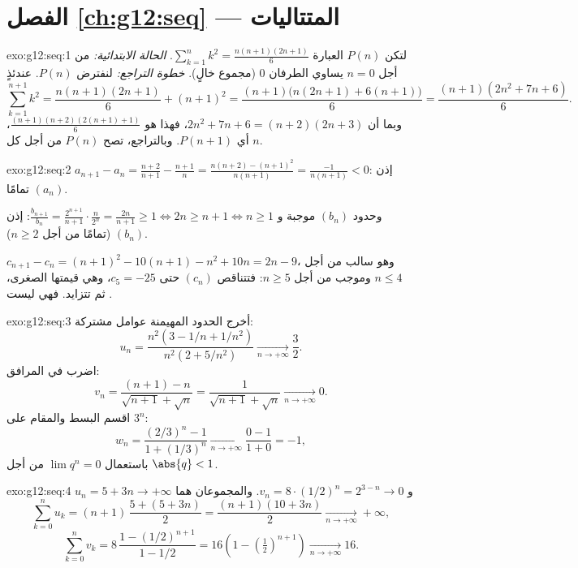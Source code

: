 \section*{الفصل \ref{ch:g12:seq} --- المتتاليات}

\begin{solution}{exo:g12:seq:1}
لتكن $P(n)$ العبارة $\sum_{k=1}^{n} k^2 = \frac{n(n+1)(2n+1)}{6}$.
\emph{الحالة الابتدائية:} من أجل $n = 0$ يساوي الطرفان $0$ (مجموع خالٍ).
\emph{خطوة التراجع:} لنفترض $P(n)$. عندئذٍ
\[
\sum_{k=1}^{n+1} k^2 = \frac{n(n+1)(2n+1)}{6} + (n+1)^2
= \frac{(n+1)\bigl(n(2n+1) + 6(n+1)\bigr)}{6}
= \frac{(n+1)(2n^2 + 7n + 6)}{6}.
\]
وبما أن $2n^2 + 7n + 6 = (n+2)(2n+3)$، فهذا هو
$\frac{(n+1)(n+2)(2(n+1)+1)}{6}$، أي $P(n+1)$. وبالتراجع، تصح $P(n)$
من أجل كل $n$.
\end{solution}

\begin{solution}{exo:g12:seq:2}
$a_{n+1} - a_n = \frac{n+2}{n+1} - \frac{n+1}{n}
= \frac{n(n+2) - (n+1)^2}{n(n+1)} = \frac{-1}{n(n+1)} < 0$: إذن $(a_n)$
 تمامًا.

وحدود $(b_n)$ موجبة و
$\frac{b_{n+1}}{b_n} = \frac{2^{n+1}}{n+1}\cdot\frac{n}{2^n} =
\frac{2n}{n+1} \geq 1 \iff 2n \geq n+1 \iff n \geq 1$: إذن $(b_n)$ 
(تمامًا من أجل $n \geq 2$).

$c_{n+1} - c_n = (n+1)^2 - 10(n+1) - n^2 + 10n = 2n - 9$، وهو سالب
من أجل $n \leq 4$ وموجب من أجل $n \geq 5$: فتتناقص $(c_n)$ حتى
$c_5 = -25$، وهي قيمتها الصغرى، ثم تتزايد. فهي ليست .
\end{solution}

\begin{solution}{exo:g12:seq:3}
أخرج الحدود المهيمنة عوامل مشتركة:
\[
u_n = \frac{n^2(3 - 1/n + 1/n^2)}{n^2(2 + 5/n^2)} \xrightarrow[n\to+\infty]{} \frac{3}{2}.
\]
اضرب في المرافق:
\[
v_n = \frac{(n+1) - n}{\sqrt{n+1} + \sqrt{n}} = \frac{1}{\sqrt{n+1}+\sqrt{n}}
\xrightarrow[n\to+\infty]{} 0.
\]
اقسم البسط والمقام على $3^n$:
\[
w_n = \frac{(2/3)^n - 1}{1 + (1/3)^n} \xrightarrow[n\to+\infty]{} \frac{0-1}{1+0} = -1,
\]
باستعمال $\lim q^n = 0$ من أجل $\abs{q} < 1$.
\end{solution}

\begin{solution}{exo:g12:seq:4}
$u_n = 5 + 3n \to +\infty$ و $v_n = 8 \cdot (1/2)^n = 2^{3-n} \to 0$.
والمجموعان هما
\[
\sum_{k=0}^{n} u_k = (n+1)\,\frac{5 + (5+3n)}{2} = \frac{(n+1)(10+3n)}{2}
\xrightarrow[n\to+\infty]{} +\infty,
\]
\[
\sum_{k=0}^{n} v_k = 8\,\frac{1 - (1/2)^{n+1}}{1 - 1/2}
= 16\left(1 - \left(\tfrac{1}{2}\right)^{n+1}\right)
\xrightarrow[n\to+\infty]{} 16 .
\]
\end{solution}


